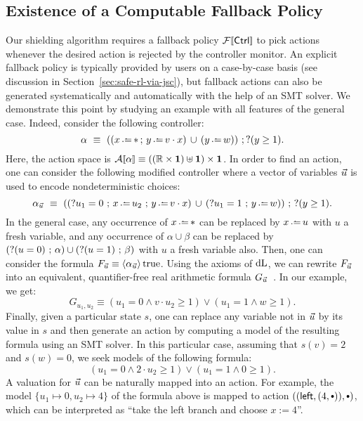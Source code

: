 \documentclass[acmsmall,screen,nonacm]{acmart}
\begin{document}
\subsection{Existence of a Computable Fallback Policy}\label{ap:generating-fallbacks}
Our shielding algorithm requires a fallback policy $\CtrlFallbackSem{\Ctrl}$ to pick actions whenever the desired action is rejected by the controller monitor. An explicit fallback policy is typically provided by users on a case-by-case basis (see discussion in Section~\ref{sec:safe-rl-via-jsc}), but fallback actions can also be generated systematically and automatically with the help of an SMT solver. We demonstrate this point by studying an example with all features of the general case. Indeed, consider the following controller:
\[
  \alpha \ \equiv \ ((x \dlassign * \,;\, y \dlassign v \cdot x) \,\cup\, (y \dlassign w)) \seq ?(y \ge 1).
\]
Here, the action space is $\CtrlActionSem{\alpha} \equiv ((\Reals \times \UnitSet) \uplus \UnitSet) \times \UnitSet$. In order to find an action, one can consider the following modified controller where a vector of variables ${\vec u}$ is used to encode nondeterministic choices:
\[
  \alpha_{\VarsVec{u}} \ \equiv \ ((?u_1 = 0 \seq x \dlassign u_2 \seq y \dlassign v \cdot x) \,\cup\, (?u_1=1 \seq y \dlassign w)) \seq\, ?(y \ge 1).
\]
In the general case, any occurrence of $x \dlassign *$ can be replaced by $x  \dlassign u$ with $u$ a fresh variable, and any occurrence of $\alpha \cup \beta$ can be replaced by $(?(u=0) \operatorname*{\,;\,} \alpha) \cup (?(u=1) \operatorname*{\,;\,} \beta)$ with $u$ a fresh variable also. Then, one can consider the formula $F_{{\vec u}} \equiv \langle\alpha_{{\vec u}}\rangle\,\text{true}$. Using the axioms of $\mathop{}\!\mathrm{d} \text{L}$, we can rewrite $F_{\vec u}$ into an equivalent, quantifier-free real arithmetic formula $G_{{\vec u}}$~\cite{DBLP:conf/hybrid/Platzer07}. In our example, we get:
\[
  G_{u_1, u_2} \equiv (u_1 = 0 \land v \cdot u_2 \ge 1) \lor (u_1 = 1 \land w \ge 1).
\]
Finally, given a particular state $s$, one can replace any variable not in ${\vec u}$ by its value in $s$ and then generate an action by computing a model of the resulting formula using an SMT solver. In this particular case, assuming that $s(v) = 2$ and $s(w) = 0$, we seek models of the following formula:
\[
  (u_1 = 0 \land 2 \cdot u_2 \ge 1) \lor (u_1 = 1 \land 0 \ge 1).
\]
A valuation for ${\vec u}$ can be naturally mapped into an action. For example, the model $\{u_1 \mapsto 0, u_2 \mapsto 4 \}$ of the formula above is mapped to action $(\SumLeftInj{(4, \Unit)}, \Unit)$, which can be interpreted as ``take the left branch and choose $x := 4$''.
\end{document}
